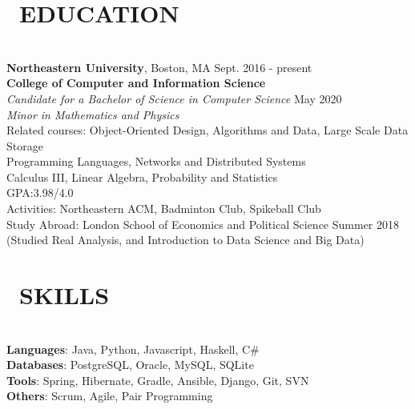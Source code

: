 \documentclass[11pt]{res}
\newcommand{\sectionunderline}{\vspace{-3mm}\hrulefill\\}
\newcommand{\listingtab}{\tabto{3.5cm}}
\newcommand{\newsect}[1]{\section{\Large \bf #1}}
\newcommand{\email}[1]{\faEnvelope\hspace{1mm} \href{mailto:#1}{#1}}
\newcommand{\phone}[1]{\faMobilePhone\hspace{1mm} #1}
\newcommand{\github}[1]{\faGit\hspace{1mm} \href{https://github.com/#1}{#1}}
\newcommand{\linkedin}[1]{\faLinkedinSquare\hspace{1mm} \href{https://linkedin.com/in/#1}{#1}}
\begin{document}
\address{
  \large\phone{(802) 503-5089}\:
  \large{$\bullet$}
  \large\email{derekpham67@gmail.com}\:
  \large{$\bullet$}
  \large\github{derekpham}\:
  \large{$\bullet$}
  \large\linkedin{derek-pham97}\\
  \normalsize Available: January - August 2019
}

\begin{resume}
  \newsect{\faGraduationCap\ EDUCATION}{
    \sectionunderline{
      {\bf Northeastern University}, Boston, MA \hfill Sept. 2016 - present\\
      {\bf College of Computer and Information Science}}\\
                     {\it Candidate for a Bachelor of Science in Computer Science} \hfill May 2020\\
                     {\it Minor in Mathematics and Physics}\vspace{2mm}\\
                     Related courses:
                     \listingtab Object-Oriented Design, Algorithms and Data, Large Scale Data Storage\\
                     \listingtab Programming Languages, Networks and Distributed Systems\\
                     \listingtab Calculus III, Linear Algebra, Probability and Statistics\\
                     GPA:\listingtab 3.98/4.0\\
                     Activities: \listingtab Northeastern ACM, Badminton Club, Spikeball Club\\
                     Study Abroad: \listingtab London School of Economics and Political Science \hfill Summer 2018\\
                     \listingtab (Studied Real Analysis, and Introduction to Data Science and Big Data)
  }

  \newsect{\faCogs\ SKILLS}{
    \sectionunderline{
      {\bf Languages}: \listingtab Java, Python, Javascript, Haskell, C\#\\
      {\bf Databases}: \listingtab PostgreSQL, Oracle, MySQL, SQLite\\
      {\bf Tools}: \listingtab Spring, Hibernate, Gradle, Ansible, Django, Git, SVN\\
      {\bf Others}: \listingtab Scrum, Agile, Pair Programming
    }
  }


\end{resume}
\end{document}
